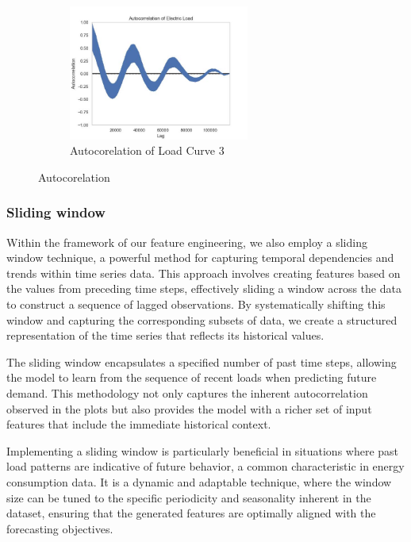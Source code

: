 \documentclass{article} %
\begin{document}
\begin{figure}[H]
    \begin{subfigure}[b]{\textwidth}
        \centering
        \includegraphics[width=0.65\textwidth]{ressources/Autocorrelation/lectricLoad_autocorrelation(2).jpg}
        \caption{Autocorelation of Load Curve 3}
        \label{fig:autocorrelation3}
    \end{subfigure}
    \caption{Autocorelation}
    \label{fig:autocorrelation}
\end{figure}
\subsubsection{Sliding window}
Within the framework of our feature engineering, we also employ a sliding window technique, a powerful method for capturing temporal dependencies and trends within time series data. This approach involves creating features based on the values from preceding time steps, effectively sliding a window across the data to construct a sequence of lagged observations. By systematically shifting this window and capturing the corresponding subsets of data, we create a structured representation of the time series that reflects its historical values. 

The sliding window encapsulates a specified number of past time steps, allowing the model to learn from the sequence of recent loads when predicting future demand. This methodology not only captures the inherent autocorrelation observed in the plots but also provides the model with a richer set of input features that include the immediate historical context. 

Implementing a sliding window is particularly beneficial in situations where past load patterns are indicative of future behavior, a common characteristic in energy consumption data. It is a dynamic and adaptable technique, where the window size can be tuned to the specific periodicity and seasonality inherent in the dataset, ensuring that the generated features are optimally aligned with the forecasting objectives. 
\end{document}

